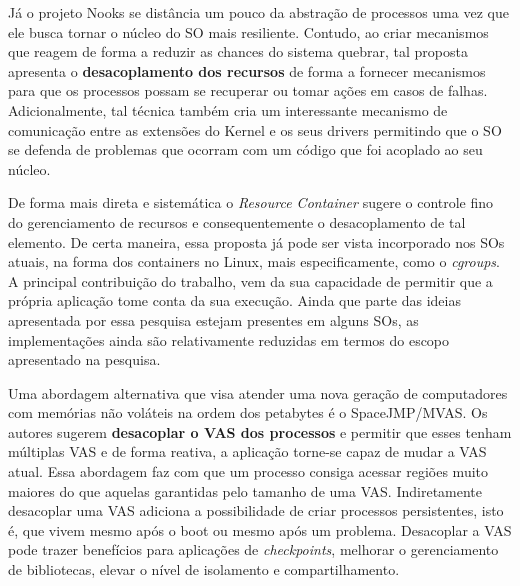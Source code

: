 Já o projeto Nooks se distância um pouco da abstração de processos uma vez que
ele busca tornar o núcleo do SO mais resiliente. Contudo, ao criar mecanismos
que reagem de forma a reduzir as chances do sistema quebrar, tal proposta
apresenta o \textbf{desacoplamento dos recursos} de forma a fornecer mecanismos
para que os processos possam se recuperar ou tomar ações em casos de falhas.
Adicionalmente, tal técnica também cria um interessante mecanismo de
comunicação entre as extensões do Kernel e os seus drivers permitindo que o SO
se defenda de problemas que ocorram com um código que foi acoplado ao seu
núcleo.

De forma mais direta e sistemática o \textit{Resource Container} sugere o
controle fino do gerenciamento de recursos e consequentemente o desacoplamento
de tal elemento. De certa maneira, essa proposta já pode ser vista incorporado
nos SOs atuais, na forma dos containers no Linux, mais especificamente, como o
\textit{cgroups}. A principal contribuição do trabalho, vem da sua capacidade
de permitir que a própria aplicação tome conta da sua execução. Ainda que parte
das ideias apresentada por essa pesquisa estejam presentes em alguns SOs, as
implementações ainda são relativamente reduzidas em termos do escopo
apresentado na pesquisa.

Uma abordagem alternativa que visa atender uma nova geração de computadores com
memórias não voláteis na ordem dos petabytes é o SpaceJMP/MVAS.  Os autores
sugerem \textbf{desacoplar o VAS dos processos} e permitir que esses tenham
múltiplas VAS e de forma reativa, a aplicação torne-se capaz de mudar a VAS
atual. Essa abordagem faz com que um processo consiga acessar regiões muito
maiores do que aquelas garantidas pelo tamanho de uma VAS. Indiretamente
desacoplar uma VAS adiciona a possibilidade de criar processos persistentes,
isto é, que vivem mesmo após o boot ou mesmo após um problema. Desacoplar a VAS
pode trazer benefícios para aplicações de \textit{checkpoints}, melhorar o
gerenciamento de bibliotecas, elevar o nível de isolamento e compartilhamento.

